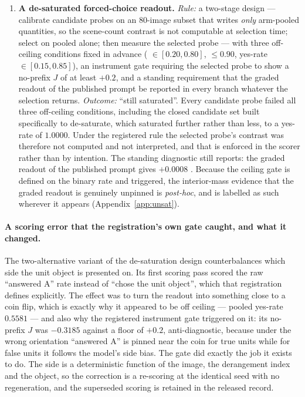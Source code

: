 \begin{enumerate}
\item \textbf{A de-saturated forced-choice readout.}
\emph{Rule:} a two-stage design --- calibrate candidate probes on an $80$-image subset that writes
\emph{only} arm-pooled quantities, so the scene-count contrast is not computable at selection time;
select on pooled \rateF{} alone; then measure the selected probe --- with three off-ceiling
conditions fixed in advance (\rateF{} $\in [0.20, 0.80]$, \rateT{} $\le 0.90$, yes-rate
$\in [0.15, 0.85]$), an instrument gate requiring the selected probe to show a no-prefix $J$ of at
least $+0.2$, and a standing requirement that the graded readout of the published prompt be reported
in every branch whatever the selection returns.
\emph{Outcome:} ``still saturated''. Every candidate probe failed all three off-ceiling
conditions, including the closed candidate set built specifically to de-saturate, which saturated
further rather than less, to a yes-rate of $1.0000$. Under the registered rule the selected probe's
contrast was therefore not computed and not interpreted, and that is enforced in the scorer rather
than by intention. The standing diagnostic still reports: the graded readout of the published prompt
gives $+0.0008$ . Because the ceiling gate is defined on the binary rate and
triggered, the interior-mass evidence that the graded readout is genuinely unpinned is \emph{post-hoc},
and is labelled as such wherever it appears (Appendix~\ref{app:unsat}).

\end{enumerate}

\paragraph{A scoring error that the registration's own gate caught, and what it changed.} The
two-alternative variant of the de-saturation design counterbalances which side the unit object is
presented on. Its first scoring pass scored the raw ``answered A'' rate instead of ``chose the unit
object'', which that registration defines explicitly. The effect was to turn the readout into
something close to a coin flip, which is exactly why it appeared to be off ceiling --- pooled
yes-rate $0.5581$ --- and also why the registered instrument gate triggered on it: its no-prefix $J$ was
$-0.3185$  against a floor of $+0.2$, anti-diagnostic, because under the wrong
orientation ``answered A'' is pinned near the coin for true units while for false units it follows
the model's side bias. The gate did exactly the job it exists to do. The side is a deterministic
function of the image, the derangement index and the object, so the correction is a re-scoring at
the identical seed with no regeneration, and the superseded scoring is retained in the released
record.

